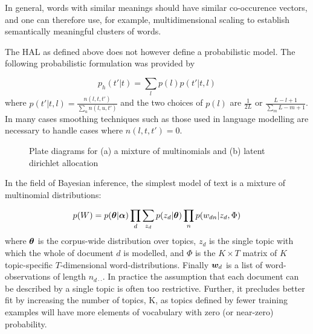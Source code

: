 In general, words with similar meanings should have similar co-occurence vectors, and one can therefore use, for example, multidimensional scaling to establish semantically meaningful clusters of words\cite{Lund1996}.

The HAL as defined above does not however define a probabilistic model. The following probabilistic formulation was provided by \cite{Azzopardi2005}

\begin{equation*}
p_h(t'|t) = \sum_l p(l) p(t'|t,l)
\end{equation*}
where $p(t'|t,l) = \frac{n(l, t, t')}{\sum_u n(l, u, t')}$ and the two choices of $p(l)$ are $\frac{1}{2L}$ or $\frac{L - l + 1}{\sum_m L - m + 1}$. In many cases smoothing techniques such as those used in language modelling are necessary to handle cases where $n(l,t,t') = 0$.
%
%


\begin{figure}
\centering
    \subfigure[]{
        
    }
    \subfigure[]{
        
    }
    \caption{Plate diagrams for (a) a mixture of multinomials and (b) latent dirichlet allocation}
\label{fig:plates}
\end{figure}

In the field of Bayesian inference, the simplest model of text is a mixture of multinomial distributions\cite{Nigam2000}:

\begin{align}
p(W) = p(\bm \theta|\bm \alpha) \prod_d \sum_{z_d} p(z_d|\bm \theta)\prod_n p(w_{dn} | z_d, \Phi)
\end{align}
where $\bm \theta$ is the corpus-wide distribution over topics, $z_d$ is the single topic with which the whole of document $d$ is modelled, and $\Phi$ is the $K \times T$ matrix of $K$ topic-specific $T$-dimensional word-distributions. Finally $\bm w_d$ is a list of word-observations of length $n_{d\cdot\cdot}$. In practice the assumption that each document can be described by a single topic is often too restrictive. Further, it precludes better fit by increasing the number of topics, K, as topics defined by fewer training examples will have more elements of vocabulary with zero (or near-zero) probability.

